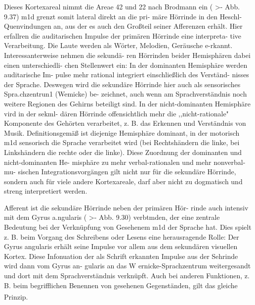 \documentclass[12pt,a4paper,pdftex]{article}
\begin{document}
Dieses Kortexareal nimmt die Areae 42 und 22 nach Brodmann
ein ( >- Abb. 9.37) m1d grenzt somit lateral direkt an die pri-
märe Hörrinde in den Heschl-Quenvindungen an, aus der es
auch den Großteil seiner Afferenzen erhält. Hier erfallren die
auditarischen Impulse der primären Hörrinde eine interpreta-
tive Verarbeitung. Die Laute werden als Wörter, Melodien,
Geräusche e-rkannt. Interessanterweise nehmen die sekundä-
ren Hörrinden beider Hemisphären dabei einen unterschiedli-
chen Stellenwert ein:
In der dominanten Hemisphäre werden auditarische Im-
pulse mehr rational integriert einschließlich des Verständ-
nisses der Sprache. Deswegen wird die sekundäre Hörrinde
hier auch als sensorisches Spra.chzentrun1 (Wemicke) be-
zeichnet, auch wenn am Sprachverständnis noch weitere
Regionen des Gehirns beteiligt sind.
In der nicht-dominanten Hemisphäre vird in der sekml-
dären Hörrinde offensichtlich mehr die ,,nicht-rationale"
Komponente des Gehörten verarbeitet, z. B. das Erkennen
und Verständnis von Musik. Definitionsgemäß ist diejenige
Hemisphäre dominant, in der motorisch m1d sensorisch die
Sprache verarbeitet wird (bei Rechtshändern die linke, bei
Linkshändern die rechte oder die linke).
Diese Zuordnung der dominanten und nicht-dominanten He-
misphäre zu mehr verbal-rationalen und mehr nonverbal-mu-
sischen Integrationsvorgängen gilt nicht nur für die sekundäre
Hörrinde, sondern auch für viele andere Kortexareale, darf
aber nicht zu dogmatisch und streng interpretiert werden.

Afferent ist die sekundäre Hörrinde neben der primären Hör-
rinde auch intensiv mit dem Gyrus a.ngularis ( >- Abb. 9.30)
verbtmden, der eine zentrale Bedeutung bei der Verknüpfung
von Gesehenem m1d der Sprache hat. Dies spielt z. B. beim Vorgang des Schreibens oder Lesens eine herausragende Rolle:
Der Gyrus angularis erhält seine Impulse vor allem aus dem
sekundären visuellen Kortex. Diese Infonuation der als Schrift
erkannten Impulse aus der Sehrinde wird dann vom Gyrus an-
gularis an das W ernicke-Sprachzentrum weitergesandt und
dort mit dem Sprachverständnis verknüpft. Auch bei anderen
Funktionen, z. B. beim begrifflichen Benennen von gesehenen
Gegenständen, gilt das gleiche Prinzip. \textsuperscript{\cite{trepel2011neuroanatomie}}

\newpage
\end{document}
